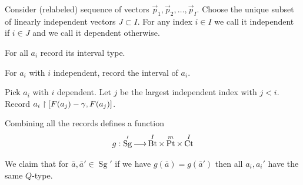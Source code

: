 \documentclass{amsart}
\DeclareMathOperator{\Sg}{Sg}
\DeclareMathOperator{\Bt}{Bt}
\DeclareMathOperator{\Pt}{Pt}
\DeclareMathOperator{\Ct}{Ct}
\begin{document}
Consider (relabeled) sequence of vectors $\vec p_1, \vec p_2, \ldots, \vec p_I$.
Choose the unique subset of linearly independent vectors $J \subset I$.
For any index $i \in I$ we call it independent if $i \in J$ and we call it dependent otherwise.

For all $a_i$ record its interval type.

For $a_i$ with $i$ independent, record the interval of $a_i$.

Pick $a_i$ with $i$ dependent.
Let $j$ be the largest independent index with $j < i$.
Record $a_i \upharpoonright [F(a_j) - \gamma, F(a_j)]$.

Combining all the records defines a function
\begin{align*}
	g: \Sg' \arr \Bt^I \times \Pt^m \times \Ct^I
\end{align*}

We claim that for $\bar a, \bar a' \in \Sg'$ if we have $g(\bar a) = g(\bar a')$ then all $a_i, a_i'$ have the same $Q$-type.
\end{document}
